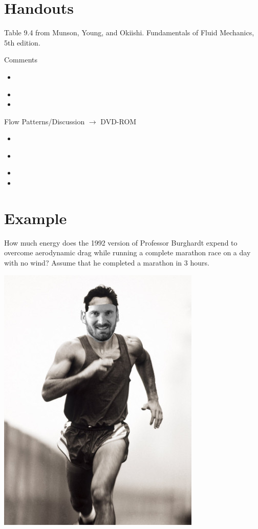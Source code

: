 \documentclass[paper=a4, fontsize=12pt]{scrartcl} %
\numberwithin{equation}{section} %
\numberwithin{figure}{section} %
\numberwithin{table}{section} %
\begin{document}
\vspace{2cm}   \section*{Handouts}

Table 9.4 from Munson, Young, and Okiishi. Fundamentals of Fluid Mechanics, 5th edition.

Comments
\begin{itemize}
  \item ~
  \vspace{1.5cm}  \item 
  \item  
\end{itemize}

Flow Patterns/Discussion $\rightarrow$ DVD-ROM

\begin{itemize}
  \item 
  \item ~
  \vspace{.5cm}  \item  
  \item
\end{itemize}

\newpage

\section*{Example}
How much energy does the 1992 version of Professor Burghardt expend to overcome aerodynamic drag while running a complete marathon race on a day with no wind? Assume that he completed a marathon in 3 hours.

\includegraphics[scale=0.5]{wesrunning.jpg}
\end{document}
